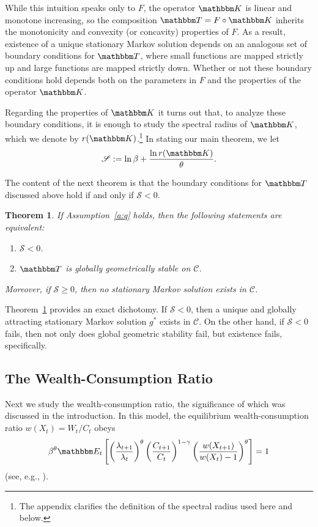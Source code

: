 \documentclass[12pt, reqno]{amsart}
\renewcommand{\geq}{\geqslant}
\newcommand{\1}{\mathbbm 1}
\newcommand{\cC}{\mathscr C}
\newcommand{\sS}{\mathscr S}
\newcommand{\KK}{\mathbbm K}
\newcommand{\EE}{\mathbbm E}
\newcommand{\TT}{\mathbbm T}
\theoremstyle{plain}
\newtheorem{theorem}{Theorem}[section]
\theoremstyle{definition}
\begin{document}
While this intuition speaks only to $F$, the operator $\KK$ is linear and
monotone increasing, so the composition $\TT = F \circ \KK$ inherits the
monotonicity and convexity (or concavity) properties of $F$.  As a result,
existence of a unique stationary Markov solution depends on an analogous set
of boundary conditions for $\TT$, where small functions are mapped strictly up
and large functions are mapped strictly down.  Whether or not these boundary
conditions hold depends both on the parameters in $F$ and the properties of
the operator $\KK$.  

Regarding the properties of $\KK$ it turns out that, to analyze these boundary
conditions, it is enough to study the spectral radius of $\KK$, which we denote
by $r(\KK)$.\footnote{The appendix clarifies the definition of the spectral
radius used here and below.} In stating our main theorem, we let
%
\begin{equation}\label{eq:blam}
    \sS := \ln \beta + \frac{\ln r(\KK)}{\theta}.
\end{equation}
%

The content of the next theorem is that the boundary conditions for $\TT$
discussed above hold if and only if $\sS < 0$.

\begin{theorem}\label{t:bk}
    If Assumption~\ref{a:q} holds, then the following statements are equivalent:
    \begin{enumerate}
        \item[{\rm (a)}] $\sS < 0$.
        \item[{\rm (b)}] $\TT$ is globally geometrically stable on $\cC$.  
    \end{enumerate}
    Moreover, if $\sS \geq 0$, then no stationary Markov solution exists in
    $\cC$.
\end{theorem}

Theorem~\ref{t:bk} provides an exact dichotomy. If $\sS < 0$,  then a unique
and globally attracting stationary Markov solution $g^*$ exists in $\cC$.  On
the other hand, if $\sS < 0$ fails, then not only does global geometric
stability fail, but existence fails, specifically.  


\subsection{The Wealth-Consumption Ratio}

Next we study the wealth-consumption ratio, the significance of which was
discussed in the introduction.
In this model, the equilibrium wealth-consumption ratio $w(X_t) = W_t / C_t$
obeys
%
\begin{equation*}
    \beta^{\theta}
    \EE_t
    \left[
    \left( \frac{\lambda_{t+1}}{\lambda_t} \right)^\theta
        \left( \frac{C_{t+1}}{C_t} \right)^{1-\gamma}
        \left( \frac{w(X_{t+1})}{w(X_t)-1} \right)^\theta
    \right] = 1
\end{equation*}
%
(see, e.g.,  \cite{schorfheide2018identifying}).  
\end{document}
